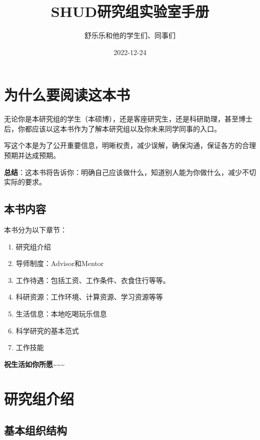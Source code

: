 \documentclass[
]{book}
\title{SHUD研究组实验室手册}
\author{舒乐乐和他的学生们、同事们}
\date{2022-12-24}
\providecommand{\tightlist}{%
  \setlength{\itemsep}{0pt}\setlength{\parskip}{0pt}}
\begin{document}
\maketitle

{
\setcounter{tocdepth}{1}
\tableofcontents
}
\hypertarget{ux4e3aux4ec0ux4e48ux8981ux9605ux8bfbux8fd9ux672cux4e66}{%
\chapter*{为什么要阅读这本书}\label{ux4e3aux4ec0ux4e48ux8981ux9605ux8bfbux8fd9ux672cux4e66}}

无论你是本研究组的学生（本硕博），还是客座研究生，还是科研助理，甚至博士后，你都应该以这本书作为了解本研究组以及你未来同学同事的入口。

写这个本是为了公开重要信息，明晰权责，减少误解，确保沟通，保证各方的合理预期并达成预期。

\textbf{总结}：这本书将告诉你：明确自己应该做什么，知道别人能为你做什么，减少不切实际的要求。

\hypertarget{ux672cux4e66ux5185ux5bb9}{%
\section*{本书内容}\label{ux672cux4e66ux5185ux5bb9}}

本书分为以下章节：

\begin{enumerate}
\def\labelenumi{\arabic{enumi}.}
\tightlist
\item
  研究组介绍
\item
  导师制度：Advisor和Mentor
\item
  工作待遇：包括工资、工作条件、衣食住行等等。
\item
  科研资源：工作环境、计算资源、学习资源等等
\item
  生活信息：本地吃喝玩乐信息
\item
  科学研究的基本范式
\item
  工作技能
\end{enumerate}

\textbf{祝生活如你所愿\textasciitilde\textasciitilde\textasciitilde{}}

\hypertarget{intro}{%
\chapter{研究组介绍}\label{intro}}

\hypertarget{ux57faux672cux7ec4ux7ec7ux7ed3ux6784}{%
\section{基本组织结构}\label{ux57faux672cux7ec4ux7ec7ux7ed3ux6784}}
\end{document}
